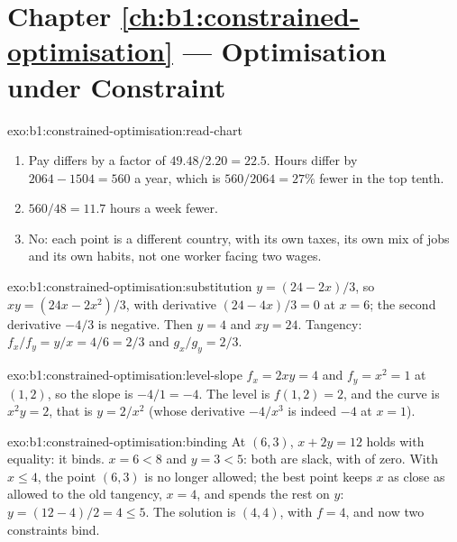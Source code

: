 \section*{Chapter \ref{ch:b1:constrained-optimisation} --- Optimisation under Constraint}

\begin{solution}{exo:b1:constrained-optimisation:read-chart}
\begin{enumerate}
  \item Pay differs by a factor of $49.48/2.20 = 22.5$. Hours differ by
    $2064 - 1504 = 560$ a year, which is $560/2064 = 27\%$ fewer in the top
    tenth.
  \item $560/48 = 11.7$ hours a week fewer.
  \item No: each point is a different country, with its own taxes, its own
    mix of jobs and its own habits, not one worker facing two wages.
\end{enumerate}
\end{solution}

\begin{solution}{exo:b1:constrained-optimisation:substitution}
$y = (24 - 2x)/3$, so $xy = (24x - 2x^2)/3$, with derivative
$(24 - 4x)/3 = 0$ at $x = 6$; the second derivative $-4/3$ is negative.
Then $y = 4$ and $xy = 24$. Tangency: $f_x/f_y = y/x = 4/6 = 2/3$ and
$g_x/g_y = 2/3$.
\end{solution}

\begin{solution}{exo:b1:constrained-optimisation:level-slope}
$f_x = 2xy = 4$ and $f_y = x^2 = 1$ at $(1, 2)$, so the slope is $-4/1 = -4$.
The level is $f(1, 2) = 2$, and the curve is $x^2y = 2$, that is $y = 2/x^2$
(whose derivative $-4/x^3$ is indeed $-4$ at $x = 1$).
\end{solution}

\begin{solution}{exo:b1:constrained-optimisation:binding}
At $(6, 3)$, $x + 2y = 12$ holds with equality: it binds. $x = 6 < 8$ and
$y = 3 < 5$: both are slack, with  of zero. With $x \le 4$, the
point $(6, 3)$ is no longer allowed; the best point keeps $x$ as close as
allowed to the old tangency, $x = 4$, and spends the rest on $y$:
$y = (12 - 4)/2 = 4 \le 5$. The solution is $(4, 4)$, with $f = 4$, and now two
constraints bind.
\end{solution}

